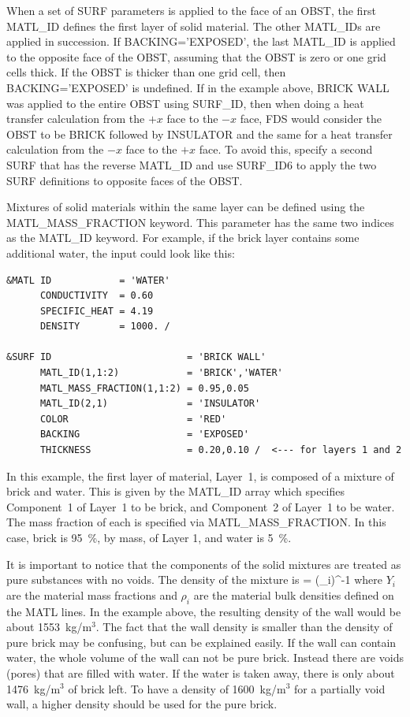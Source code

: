 \documentclass[11pt]{book}
\begin{document}
When a set of {\ct SURF} parameters is applied to the face of an {\ct OBST}, the first {\ct MATL\_ID} defines the first layer of solid material. The other {\ct MATL\_ID}s are applied in succession. If {\ct BACKING='EXPOSED'}, the last {\ct MATL\_ID} is applied to the opposite face of the {\ct OBST}, assuming that the {\ct OBST} is zero or one grid cells thick. If the {\ct OBST} is thicker than one grid cell, then {\ct BACKING='EXPOSED'} is undefined. If in the example above, {\ct BRICK WALL} was applied to the entire {\ct OBST} using {\ct SURF\_ID}, then when doing a heat transfer calculation from the $+x$ face to the $-x$ face, FDS would consider the {\ct OBST} to be {\ct BRICK} followed by {\ct INSULATOR} and the same for a heat transfer
calculation from the $-x$ face to the $+x$ face.  To avoid this, specify a second {\ct SURF} that has the reverse {\ct MATL\_ID} and use {\ct SURF\_ID6} to apply the two {\ct SURF} definitions to opposite faces of the {\ct OBST}.

Mixtures of solid materials within the same layer can be defined using
the {\ct MATL\_MASS\_FRACTION} keyword. This parameter has the same
two indices as the {\ct MATL\_ID} keyword. For example, if the
brick layer contains some additional water, the input could look like this:
\begin{lstlisting}
&MATL ID            = 'WATER'
      CONDUCTIVITY  = 0.60
      SPECIFIC_HEAT = 4.19
      DENSITY       = 1000. /

&SURF ID                        = 'BRICK WALL'
      MATL_ID(1,1:2)            = 'BRICK','WATER'
      MATL_MASS_FRACTION(1,1:2) = 0.95,0.05
      MATL_ID(2,1)              = 'INSULATOR'
      COLOR                     = 'RED'
      BACKING                   = 'EXPOSED'
      THICKNESS                 = 0.20,0.10 /  <--- for layers 1 and 2
\end{lstlisting}
In this example, the first layer of material, Layer~1, is composed of a mixture of
brick and water. This is given by the {\ct MATL\_ID} array which specifies
Component~1 of Layer~1 to be brick, and Component~2 of
Layer~1 to be water. The mass fraction of each is specified via {\ct MATL\_MASS\_FRACTION}. In this
case, brick is 95~\%, by mass, of Layer 1, and water is 5~\%.

It is important to notice that the components of the solid mixtures
are treated as pure substances with no voids. The density of the
mixture is
\be
\rho = \left(\sum_i\right)^{-1}
\ee
where $Y_i$ are the material mass fractions and $\rho_i$ are the
material bulk densities defined on the {\ct MATL} lines. In the
example above, the resulting density of the wall would be about
1553~kg/m$^3$. The fact that the wall density is smaller than the
density of pure brick may be confusing, but can be explained easily.
If the wall can contain water, the whole volume of the wall can not be
pure brick. Instead there are voids (pores) that are
filled with water. If the water is taken away, there is only about
1476~kg/m$^3$ of brick left. To have a density of 1600~kg/m$^3$ for a
partially void wall, a higher density should be used for the pure
brick.
\end{document}
